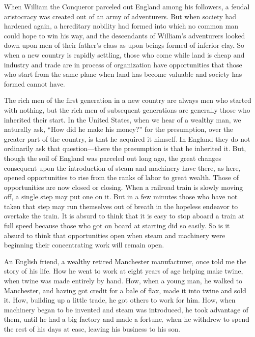 \documentclass{book}
\begin{document}
When William the Conqueror parceled out England among his followers, a feudal aristocracy was created out of an army of adventurers. But when society had hardened again, a hereditary nobility had formed into which no common man could hope to win his way, and the descendants of William’s adventurers looked down upon men of their father’s class as upon beings formed of inferior clay. So when a new country is rapidly settling, those who come while land is cheap and industry and trade are in process of organization have opportunities that those who start from the same plane when land has become valuable and society has formed cannot have.

The rich men of the first generation in a new country are always men who started with nothing, but the rich men of subsequent generations are generally those who inherited their start. In the United States, when we hear of a wealthy man, we naturally ask, “How did he make his money?” for the presumption, over the greater part of the country, is that he acquired it himself. In England they do not ordinarily ask that question—there the presumption is that he inherited it. But, though the soil of England was parceled out long ago, the great changes consequent upon the introduction of steam and machinery have there, as here, opened opportunities to rise from the ranks of labor to great wealth. Those of opportunities are now closed or closing. When a railroad train is slowly moving off, a single step may put one on it. But in a few minutes those who have not taken that step may run themselves out of breath in the hopeless endeavor to overtake the train. It is absurd to think that it is easy to stop aboard a train at full speed because those who got on board at starting did so easily. So is it absurd to think that opportunities open when steam and machinery were beginning their concentrating work will remain open.

An English friend, a wealthy retired Manchester manufacturer, once told me the story of his life. How he went to work at eight years of age helping make twine, when twine was made entirely by hand. How, when a young man, he walked to Manchester, and having got credit for a bale of flax, made it into twine and sold it. How, building up a little trade, he got others to work for him. How, when machinery began to be invented and steam was introduced, he took advantage of them, until he had a big factory and made a fortune, when he withdrew to spend the rest of his days at ease, leaving his business to his son.
\end{document}
